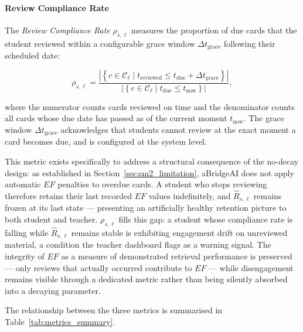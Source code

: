 \paragraph{Review Compliance Rate}
The \textit{Review Compliance Rate} $\rho_{s,\ell}$ measures the proportion of due cards that the student reviewed within a configurable grace window $\Delta t_{\text{grace}}$ following their scheduled date:

\begin{equation}
\rho_{s,\ell} = \frac{
    \left|\left\{
        c \in \mathcal{C}_{\ell} \mid 
        t_{\text{reviewed}} \leq 
        t_{\text{due}} + \Delta t_{\text{grace}}
    \right\}\right|
}{
    \left|\left\{
        c \in \mathcal{C}_{\ell} \mid 
        t_{\text{due}} \leq t_{\text{now}}
    \right\}\right|
},
\end{equation}

where the numerator counts cards reviewed on time and the denominator counts all cards whose due date has passed as of the current moment $t_{\text{now}}$. The grace window $\Delta t_{\text{grace}}$ acknowledges that students cannot review at the exact moment a card becomes due, and is configured at the system level.

This metric exists specifically to address a structural consequence of the no-decay design: as established in Section~\ref{sec:sm2_limitation}, aBridgeAI does not apply automatic $EF$ penalties to overdue cards. A student who stops reviewing therefore retains their last recorded $EF$ values indefinitely, and $\hat{R}_{s,\ell}$ remains frozen at its last state — presenting an artificially healthy retention picture to both student and teacher. $\rho_{s,\ell}$ fills this gap: a student whose compliance rate is falling while $\hat{R}_{s,\ell}$ remains stable is exhibiting engagement drift on unreviewed material, a condition the teacher dashboard flags as a warning signal. The integrity of $EF$ as a measure of demonstrated retrieval performance is preserved — only reviews that actually occurred contribute to $EF$ — while disengagement remains visible through a dedicated metric rather than being silently absorbed into a decaying parameter.

\medskip
\noindent
The relationship between the three metrics is summarised in Table~\ref{tab:metrics_summary}.


